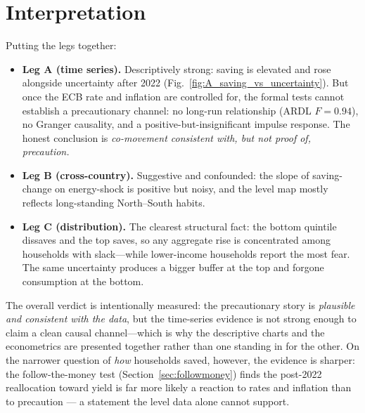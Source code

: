 \documentclass[11pt,a4paper]{article}
\begin{document}
\section{Interpretation}\label{sec:interpretation}

Putting the legs together:
\begin{itemize}
  \item \textbf{Leg A (time series).} Descriptively strong: saving is elevated
  and rose alongside uncertainty after 2022 (Fig.~\ref{fig:A_saving_vs_uncertainty}).
  But once the ECB rate and inflation are controlled for, the formal tests
  cannot establish a precautionary channel: no long-run relationship (ARDL
  $F=0.94$), no Granger causality, and a positive-but-insignificant impulse
  response. The honest conclusion is \emph{co-movement consistent with, but not
  proof of, precaution.}
  \item \textbf{Leg B (cross-country).} Suggestive and confounded: the slope of
  saving-change on energy-shock is positive but noisy, and the level map mostly
  reflects long-standing North--South habits.
  \item \textbf{Leg C (distribution).} The clearest structural fact: the bottom
  quintile dissaves and the top saves, so any aggregate rise is concentrated
  among households with slack---while lower-income households report the most
  fear. The same uncertainty produces a bigger buffer at the top and forgone
  consumption at the bottom.
\end{itemize}
The overall verdict is intentionally measured: the precautionary story is
\emph{plausible and consistent with the data}, but the time-series evidence is
not strong enough to claim a clean causal channel---which is why the descriptive
charts and the econometrics are presented together rather than one standing in
for the other. On the narrower question of \emph{how} households saved, however,
the evidence is sharper: the follow-the-money test (Section~\ref{sec:followmoney})
finds the post-2022 reallocation toward yield is far more likely a reaction to
rates and inflation than to precaution --- a statement the level data alone cannot
support.

\end{document}
